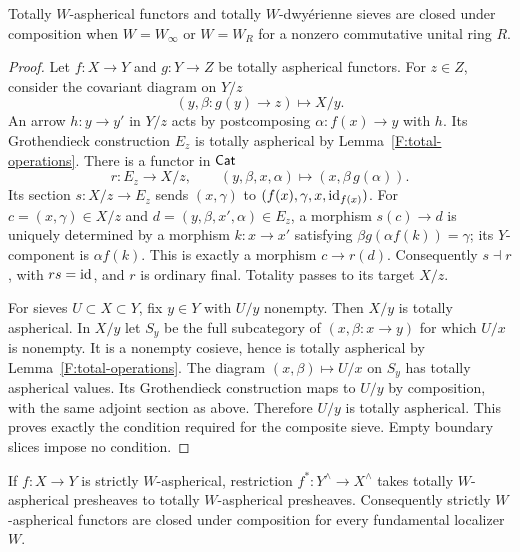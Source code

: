 \begin{theorem}\label{F:total-composition}
Totally $W$-aspherical functors and totally
$W$-dwy\'erienne sieves are closed under composition when
$W=W_\infty$ or $W=W_R$ for a nonzero commutative unital ring $R$.
\end{theorem}

\begin{proof}
Let $f:X\to Y$ and $g:Y\to Z$ be totally aspherical functors.
For $z\in Z$, consider the covariant diagram on $Y/z$
\[
 (y,\beta:g(y)\to z)\longmapsto X/y.
\]
An arrow $h:y\to y'$ in $Y/z$ acts by postcomposing
$\alpha:f(x)\to y$ with $h$. Its Grothendieck construction $E_z$
is totally aspherical by Lemma~\ref{F:total-operations}. There is
a functor in $\mathsf{Cat}$
\[
 r:E_z\longrightarrow X/z,
 \qquad (y,\beta,x,\alpha)\longmapsto
 (x,\beta\,g(\alpha)).
\]
Its section $s:X/z\to E_z$ sends $(x,\gamma)$ to
$(f(x),\gamma,x,\mathrm{id}_{f(x)})$. For $c=(x,\gamma)\in X/z$
and $d=(y,\beta,x',\alpha)\in E_z$, a morphism $s(c)\to d$
is uniquely determined by a morphism $k:x\to x'$ satisfying
$\beta g(\alpha f(k))=\gamma$; its $Y$-component is
$\alpha f(k)$. This is exactly a morphism $c\to r(d)$.
Consequently $s\dashv r$, with $rs=\mathrm{id}$, and $r$ is ordinary
final. Totality passes to its target $X/z$.

For sieves $U\subset X\subset Y$, fix $y\in Y$ with $U/y$
nonempty. Then $X/y$ is totally aspherical. In $X/y$ let $S_y$
be the full subcategory of $(x,\beta:x\to y)$ for which $U/x$
is nonempty. It is a nonempty cosieve, hence is totally aspherical
by Lemma~\ref{F:total-operations}. The diagram
$(x,\beta)\mapsto U/x$ on $S_y$ has totally aspherical values.
Its Grothendieck construction maps to $U/y$ by composition,
with the same adjoint section as above. Therefore $U/y$ is
totally aspherical. This proves exactly the condition required
for the composite sieve. Empty boundary slices impose no condition.
\end{proof}

\begin{theorem}\label{F:strict-composition}
If $f:X\to Y$ is strictly $W$-aspherical, restriction
$f^*:Y^{\wedge}\to X^{\wedge}$ takes totally
$W$-aspherical presheaves to totally $W$-aspherical
presheaves. Consequently strictly $W$-aspherical functors
are closed under composition for every fundamental
localizer $W$.
\end{theorem}

